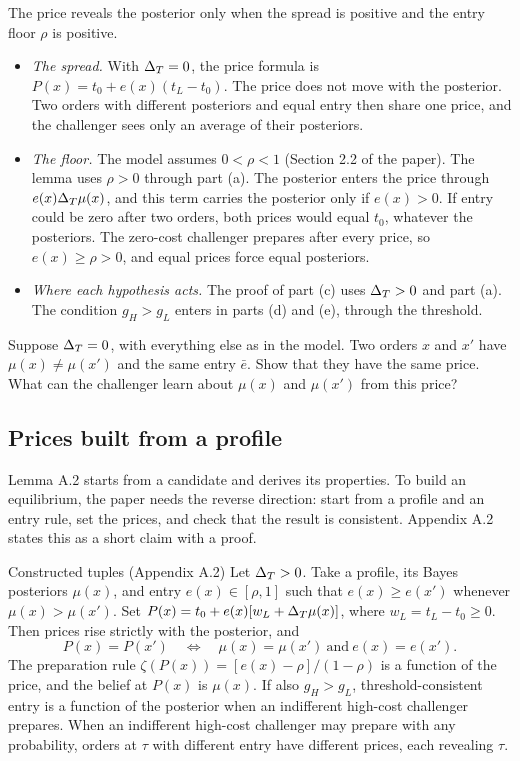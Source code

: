 \begin{watchout}
The price reveals the posterior only when the spread is positive and the entry floor \(\rho\) is positive.
\begin{itemize}
\item \emph{The spread.} With \(\Delta_T=0\), the price formula is \(P(x)=t_0+e(x)(t_L-t_0)\). The price does not move with the posterior. Two orders with different posteriors and equal entry then share one price, and the challenger sees only an average of their posteriors.
\item \emph{The floor.} The model assumes \(0<\rho<1\) (Section 2.2 of the paper). The lemma uses \(\rho>0\) through part (a). The posterior enters the price through \(e(x)\Delta_T\mu(x)\), and this term carries the posterior only if \(e(x)>0\). If entry could be zero after two orders, both prices would equal \(t_0\), whatever the posteriors. The zero-cost challenger prepares after every price, so \(e(x)\ge\rho>0\), and equal prices force equal posteriors.
\item \emph{Where each hypothesis acts.} The proof of part (c) uses \(\Delta_T>0\) and part (a). The condition \(g_H>g_L\) enters in parts (d) and (e), through the threshold.
\end{itemize}
\end{watchout}

\begin{checkyourself}\label{q:beliefs-flat}
Suppose \(\Delta_T=0\), with everything else as in the model. Two orders \(x\) and \(x'\) have \(\mu(x)\ne\mu(x')\) and the same entry \(\bar e\). Show that they have the same price. What can the challenger learn about \(\mu(x)\) and \(\mu(x')\) from this price?
\end{checkyourself}

\subsection{Prices built from a profile}\label{sec:beliefs-constructed}

Lemma A.2 starts from a candidate and derives its properties. To build an equilibrium, the paper needs the reverse direction: start from a profile and an entry rule, set the prices, and check that the result is consistent. Appendix A.2 states this as a short claim with a proof.

\begin{paperresult}{Constructed tuples (Appendix A.2)}
Let \(\Delta_T>0\). Take a profile, its Bayes posteriors \(\mu(x)\), and entry \(e(x)\in[\rho,1]\) such that \(e(x)\ge e(x')\) whenever \(\mu(x)>\mu(x')\). Set \(P(x)=t_0+e(x)[w_L+\Delta_T\mu(x)]\), where \(w_L=t_L-t_0\ge0\). Then prices rise strictly with the posterior, and
\[
P(x)=P(x')\quad\Longleftrightarrow\quad\mu(x)=\mu(x')\ \text{and}\ e(x)=e(x').
\]
The preparation rule \(\zeta(P(x))=[e(x)-\rho]/(1-\rho)\) is a function of the price, and the belief at \(P(x)\) is \(\mu(x)\). If also \(g_H>g_L\), threshold-consistent entry is a function of the posterior when an indifferent high-cost challenger prepares. When an indifferent high-cost challenger may prepare with any probability, orders at \(\tau\) with different entry have different prices, each revealing \(\tau\).
\end{paperresult}


